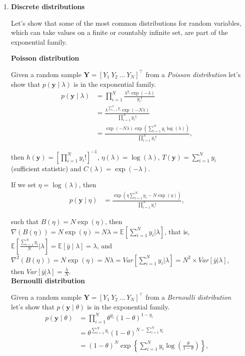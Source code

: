 \begin{enumerate}

\item \textbf{Discrete distributions}

Let's show that some of the most common distributions for random variables, which can take values on a finite or countably infinite set, are part of the exponential family.
 
\textbf{Poisson distribution} 

Given a random sample $\bm{Y}=[Y_1 \ Y_2 \ \dots \ Y_N]^{\top}$ from a \textit{Poisson distribution} let's show that $p(\bm{y}\mid \lambda)$ is in the exponential family.
\begin{align}
	p(\bm{y}\mid \lambda)&=\prod_{i=1}^N \frac{\lambda^{y_i} \exp(-\lambda)}{y_i!}\nonumber\\
	&=\frac{\lambda^{\sum_{i=1}^N y_i}\exp(-N\lambda)}{\prod_{i=1}^N y_i!}\nonumber\\
	&=\frac{\exp(-N\lambda)\exp(\sum_{i=1}^Ny_i\log(\lambda))}{\prod_{i=1}^N y_i!}\nonumber,
\end{align}

then $h(\bm{y})=\left[\prod_{i=1}^N y_i!\right]^{-1}$, $\eta(\lambda)=\log(\lambda)$, $T(\bm{y})=\sum_{i=1}^N y_i$ (sufficient statistic) and $C(\lambda)=\exp(-\lambda)$.

If we set $\eta=\log(\lambda)$, then 
\begin{align}
	p(\bm{y}\mid \eta)&=\frac{\exp(\eta\sum_{i=1}^Ny_i-N\exp(\eta))}{\prod_{i=1}^N y_i!},\nonumber
\end{align}

such that $B(\eta)=N\exp(\eta)$, then $\nabla(B(\eta))=N\exp(\eta)=N\lambda=\mathbb{E}\left[\sum_{i=1}^N y_i\biggr\rvert\lambda\right]$, that is, $\mathbb{E}\left[\frac{\sum_{i=1}^N y_i}{N}\biggr\rvert\lambda\right]=\mathbb{E}[\bar{y}\mid \lambda]=\lambda$, and $\nabla^2(B(\eta))=N\exp(\eta)=N\lambda=Var\left[\sum_{i=1}^N y_i\biggr\rvert\lambda\right]=N^2 \times Var\left[\bar{y}\rvert\lambda\right]$, then $Var\left[\bar{y}\rvert\lambda\right]=\frac{\lambda}{N}$.\\ 

\textbf{Bernoulli distribution}

Given a random sample $\bm{Y}=[Y_1 \ Y_2 \ \dots \ Y_N]^{\top}$ from a \textit{Bernoulli distribution} let's show that $p(\bm{y}\mid \theta)$ is in the exponential family.
\begin{align}
	p(\bm{y}\mid \theta)&=\prod_{i=1}^N \theta^{y_i}(1-\theta)^{1-y_i}\nonumber\\
	&=\theta^{\sum_{i=1}^N y_i}(1-\theta)^{N-\sum_{i=1}^N y_i}\nonumber\\
	&=(1-\theta)^N\exp\left\{\sum_{i=1}^N y_i\log\left(\frac{\theta}{1-\theta}\right)\right\}\nonumber,
\end{align}


\end{enumerate}
